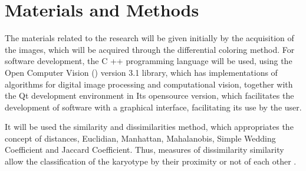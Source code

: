\chapter{Materials and Methods} \label{cap:metod}

The materials related to the research will be given initially by the acquisition of the images, which will be acquired through the differential coloring method. For software development, the C ++ programming language will be used, using the Open Computer Vision () version 3.1 library, which has implementations of algorithms for digital image processing and computational vision, together with the Qt development environment in Its opensource version, which facilitates the development of software with a graphical interface, facilitating its use by the user.

It will be used the similarity and dissimilarities method, which appropriates the concept of distances, Euclidian, Manhattan, Mahalanobis, Simple Wedding Coefficient and Jaccard Coefficient. Thus, measures of dissimilarity similarity allow the classification of the karyotype by their proximity or not of each other \cite{Genomika2015}.